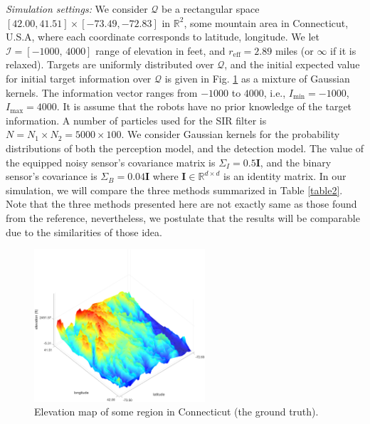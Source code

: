 \documentclass[letterpaper, 10 pt, conference]{ieeeconf}
\begin{document}
\textit{Simulation settings:}
We consider  $\mathcal{Q}$ be a rectangular space $[42.00,41.51]\times [-73.49,-72.83]$ in $\mathbb{R}^2$, some mountain area in Connecticut, U.S.A, where each coordinate corresponds to latitude, longitude. We let $\mathcal{I} = [-1000,\,4000]$ range of elevation in feet, and $r_{\text{eff}} =2.89$ miles (or $\infty$ if it is relaxed). Targets are uniformly distributed over $\mathcal{Q}$, and the initial expected value for initial target information over $\mathcal{Q}$ is given in Fig. \ref{fig:fig1} as a mixture of Gaussian kernels. The information vector ranges from $-1000$ to $4000$, i.e., $I_{\min} = -1000$, $I_{\max} = 4000$.
It is assume that the robots have no prior knowledge of the target information.
A number of particles used for the SIR filter is $N= N_1\times N_2 = 5000 \times 100$. We consider Gaussian kernels for the probability distributions of both the perception model, and the detection model. The value of the equipped noisy sensor's covariance matrix is $\Sigma_I = 0.5\mathbf{I}$, and the binary sensor's covariance is $\Sigma_B = 0.04\mathbf{I}$ where $\mathbf{I} \in \mathbb{R}^{d\times d}$ is an identity matrix.
In our simulation, we will compare the three methods summarized in Table \ref{table2}. Note that the three methods presented here are not exactly same as those found from the reference, nevertheless, we postulate that the results will be comparable due to the similarities of those idea.
\begin{table}[]
	\centering
	\caption{Summary of deployment methods considered in current section:}
				\label{table2}	
	{\scriptsize
		}
\end{table}

\begin{figure}
	\centering
	\includegraphics[width=2.5in]{figure/gtruth3d}
	\caption{Elevation map of some region in Connecticut (the ground truth).} 
	\label{fig:fig1}
\end{figure}
\end{document}
